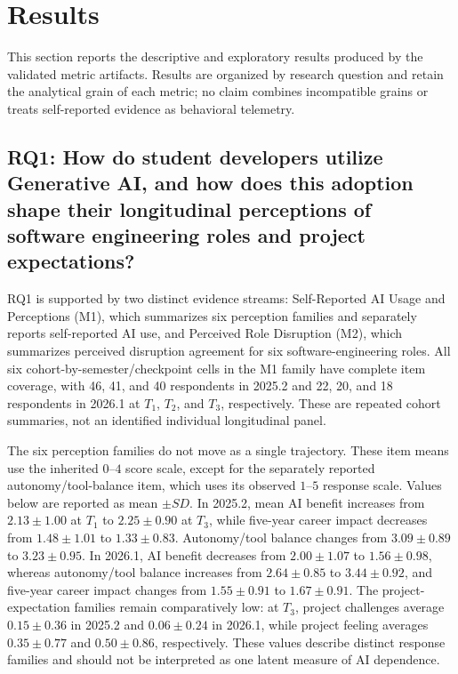\section{Results}
This section reports the descriptive and exploratory results produced by the
validated metric artifacts. Results are organized by research question and
retain the analytical grain of each metric; no claim combines incompatible
grains or treats self-reported evidence as behavioral telemetry.

\subsection{RQ1: How do student developers utilize Generative AI, and how does this adoption shape their longitudinal perceptions of software engineering roles and project expectations?}

RQ1 is supported by two distinct evidence streams: Self-Reported AI Usage and
Perceptions (M1),
which summarizes six perception families and separately reports self-reported
AI use, and Perceived Role Disruption (M2), which summarizes perceived
disruption agreement for six software-engineering roles. All six
cohort-by-semester/checkpoint cells in the M1 family
have complete item coverage, with 46, 41, and 40 respondents in 2025.2 and
22, 20, and 18 respondents in 2026.1 at $T_1$, $T_2$, and $T_3$, respectively.
These are repeated cohort summaries, not an identified individual longitudinal
panel.

The six perception families do not move as a single trajectory. These item
means use the inherited $0$--$4$ score scale, except for the separately
reported autonomy/tool-balance item, which uses its observed $1$--$5$ response
scale. Values below are reported as mean $\pm SD$. In 2025.2, mean AI benefit
increases from $2.13 \pm 1.00$ at $T_1$ to $2.25 \pm 0.90$ at $T_3$, while
five-year career impact decreases from $1.48 \pm 1.01$ to $1.33 \pm 0.83$.
Autonomy/tool balance changes from $3.09 \pm 0.89$ to $3.23 \pm 0.95$. In
2026.1, AI benefit decreases from $2.00 \pm 1.07$ to $1.56 \pm 0.98$,
whereas autonomy/tool balance increases from $2.64 \pm 0.85$ to
$3.44 \pm 0.92$, and five-year career impact changes from $1.55 \pm 0.91$
to $1.67 \pm 0.91$. The project-expectation families remain comparatively
low: at $T_3$, project challenges average $0.15 \pm 0.36$ in 2025.2 and
$0.06 \pm 0.24$ in 2026.1, while project feeling averages $0.35 \pm 0.77$
and $0.50 \pm 0.86$, respectively. These values describe
distinct response families and should not be interpreted as one latent measure
of AI dependence.

